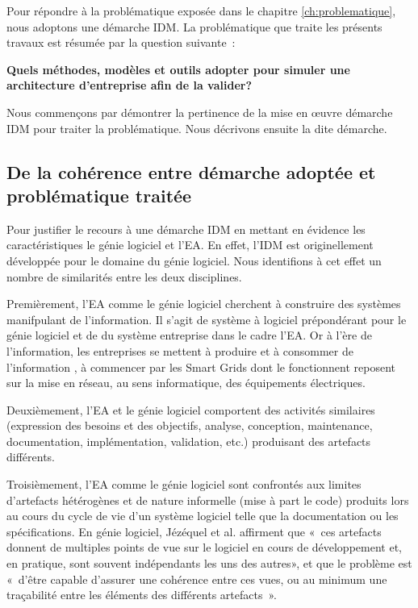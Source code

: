     Pour répondre à la problématique exposée dans le chapitre
    \ref{ch:problematique}, nous adoptons une démarche IDM.  La problématique que traite les présents travaux est résumée par la question suivante~: 

    {\bfseries Quels méthodes, modèles et outils adopter pour simuler une architecture d'entreprise afin de la valider?}

    Nous commençons par démontrer la pertinence de la mise en œuvre
    démarche IDM  pour traiter  la problématique.  Nous décrivons
    ensuite la dite démarche.

    \subsection{De la cohérence entre démarche adoptée et
    problématique traitée}

    Pour justifier le recours à une démarche IDM en mettant en
    évidence les caractéristiques le génie logiciel et l'EA. En effet,
    l'IDM est originellement développée pour le domaine du génie
    logiciel. Nous identifions à cet effet un nombre de similarités
    entre les deux disciplines.

    Premièrement, l'EA comme le génie logiciel cherchent à construire
    des systèmes manifpulant de l'information. Il s'agit de système à
    logiciel prépondérant \cite{jezequel2012ingenierie} pour le génie
    logiciel et de du système entreprise dans le cadre l'EA. Or à
    l'ère de l'information, les entreprises se mettent à produire et à
    consommer de l'information \cite{zachman1997enterprise}, à
    commencer par les Smart Grids dont le fonctionnent reposent sur la
    mise en réseau, au sens informatique, des équipements électriques.

    Deuxièmement, l'EA et le génie logiciel comportent des activités
    similaires (expression des besoins et des objectifs, analyse,
    conception, maintenance, documentation, implémentation,
    validation, etc.) produisant des artefacts différents.

    Troisièmement, l'EA comme le génie logiciel sont confrontés aux
    limites d'artefacts hétérogènes et de nature informelle (mise à
    part le code) produits lors au cours du cycle de vie d'un système
    logiciel telle que la documentation ou les spécifications.  En
    génie logiciel, Jézéquel et al. \cite{jezequel2006genie} affirment
    que «~ces artefacts donnent de multiples points de vue sur le
    logiciel en cours de développement et, en pratique, sont souvent
    indépendants les uns des autres», et que le problème est «~d’être
    capable d'assurer une cohérence entre ces vues, ou au minimum une
    traçabilité entre les éléments des différents artefacts~».

